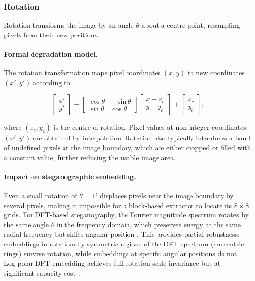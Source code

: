 \documentclass[12pt,a4paper,oneside]{report}
\begin{document}
	\subsubsection{Rotation}
	
	Rotation transforms the image by an angle $\theta$ about a centre point, resampling pixels from
	their new positions.
	
	\paragraph{Formal degradation model.}
	The rotation transformation maps pixel coordinates $(x,y)$ to new coordinates $(x', y')$
	according to:
	
	\begin{equation}
		\begin{bmatrix} x' \\ y' \end{bmatrix}
		=
		\begin{bmatrix} \cos\theta & -\sin\theta \\ \sin\theta & \cos\theta \end{bmatrix}
		\begin{bmatrix} x - x_c \\ y - y_c \end{bmatrix}
		+
		\begin{bmatrix} x_c \\ y_c \end{bmatrix},
		\label{eq:rotation}
	\end{equation}
	
	where $(x_c, y_c)$ is the centre of rotation. Pixel values at non-integer coordinates
	$(x', y')$ are obtained by interpolation. Rotation also typically introduces a band of
	undefined pixels at the image boundary, which are either cropped or filled with a constant
	value, further reducing the usable image area.
	
	\paragraph{Impact on steganographic embedding.}
	Even a small rotation of $\theta = 1°$ displaces pixels near the image boundary by several
	pixels, making it impossible for a block-based extractor to locate its $8 \times 8$ grids.
	For DFT-based steganography, the Fourier magnitude spectrum rotates by the same angle $\theta$
	in the frequency domain, which preserves energy at the same radial frequency but shifts angular
	position \cite{bracewell2000fourier}. This provides partial robustness: embeddings in
	rotationally symmetric regions of the DFT spectrum (concentric rings) survive rotation, while
	embeddings at specific angular positions do not. Log-polar DFT embedding achieves full
	rotation-scale invariance but at significant capacity cost \cite{ruanaidh1998rotation}.
	
\end{document}

